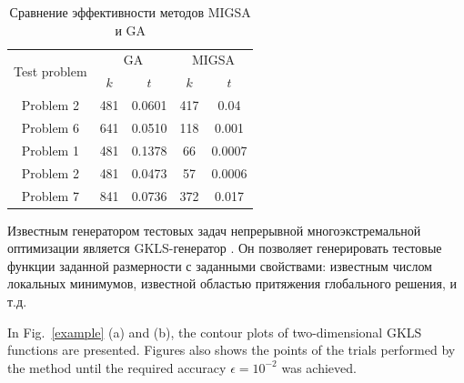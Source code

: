 \documentclass[
11pt,%
tightenlines,%
twoside,%
onecolumn,%
nofloats,%
nobibnotes,%
nofootinbib,%
superscriptaddress,%
noshowpacs,%
centertags]%
{revtex4}
\begin{document}
\begin{table}
	\caption{Сравнение эффективности методов MIGSA и GA}
	\label{tab:1}
	\center
	\begin{tabular}{|c|c|c|c|c|}
		\hline
	\multirow{2}{*}{Test problem}	 & \multicolumn{2}{c|}{ GA } &  \multicolumn{2}{c|}{MIGSA} \\
		\cline{2-3} \cline{4-5} 
		 & $k$ & $t$ &  $k$ & $t$  \\
		\hline 
		 Problem 2 \cite{Floudas}&	481 &	0.0601 & 	417 &	0.04 \\
		 Problem 6 \cite{Floudas}&	641 &	0.0510 & 	118 &	0.001 \\
		 Problem 1 \cite{Deep}   &	481 &	0.1378 & 	66 &	0.0007 \\
		 Problem 2 \cite{Deep}   &	481 &	0.0473 & 	57 &	0.0006 \\
		 Problem 7 \cite{Deep}   &	841 &	0.0736 &  372	 &	0.017 \\
		\hline
	\end{tabular}
\end{table}	




Известным генератором тестовых задач непрерывной многоэкстремальной оптимизации является GKLS-генератор \cite{Gaviano}. Он позволяет генерировать тестовые функции заданной размерности с заданными свойствами: известным числом локальных минимумов, известной областью притяжения глобального решения, и т.д.  

In Fig.~\ref{example} (a) and (b), the contour plots of two-dimensional GKLS functions are presented. Figures also shows the points of the trials performed by the method until the required accuracy $\epsilon=10^{-2}$ was achieved.
\end{document}
